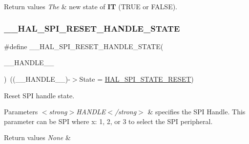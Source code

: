\begin{DoxyRetVals}{Return values}
{\em The} & new state of {\bfseries{IT}} (T\+R\+UE or F\+A\+L\+SE). \\
\hline
\end{DoxyRetVals}
\mbox{\label{group___s_p_i___exported___macros_ga0d846f9517715960873e854b4a0790b0}} 
\subsubsection{\texorpdfstring{\_\_HAL\_SPI\_RESET\_HANDLE\_STATE}{\_\_HAL\_SPI\_RESET\_HANDLE\_STATE}}
{\footnotesize\ttfamily \#define \+\_\+\+\_\+\+H\+A\+L\+\_\+\+S\+P\+I\+\_\+\+R\+E\+S\+E\+T\+\_\+\+H\+A\+N\+D\+L\+E\+\_\+\+S\+T\+A\+TE(\begin{DoxyParamCaption}\item[{}]{\+\_\+\+\_\+\+H\+A\+N\+D\+L\+E\+\_\+\+\_\+ }\end{DoxyParamCaption})~((\+\_\+\+\_\+\+H\+A\+N\+D\+L\+E\+\_\+\+\_\+)-\/$>$State = \mbox{\hyperlink{group___s_p_i___exported___types_gga8891cb64e76198a860172d94c638c9b4adbc218df2c9841b561282b40b3ded69d}{H\+A\+L\+\_\+\+S\+P\+I\+\_\+\+S\+T\+A\+T\+E\+\_\+\+R\+E\+S\+ET}})}



Reset S\+PI handle state. 


\begin{DoxyParams}{Parameters}
{\em $<$strong$>$\+H\+A\+N\+D\+L\+E$<$/strong$>$} & specifies the S\+PI Handle. This parameter can be S\+PI where x\+: 1, 2, or 3 to select the S\+PI peripheral. \\
\hline
\end{DoxyParams}

\begin{DoxyRetVals}{Return values}
{\em None} & \\
\hline
\end{DoxyRetVals}
